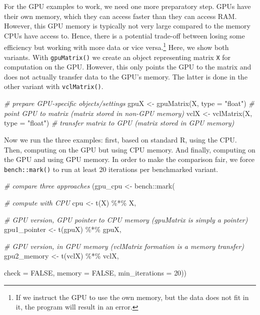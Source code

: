 \documentclass[
  12pt,
]{style/krantz}
\newenvironment{Shaded}{\begin{snugshade}}{\end{snugshade}}
\newcommand{\AttributeTok}[1]{\textcolor[rgb]{0.77,0.63,0.00}{#1}}
\newcommand{\CommentTok}[1]{\textcolor[rgb]{0.56,0.35,0.01}{\textit{#1}}}
\newcommand{\ConstantTok}[1]{\textcolor[rgb]{0.00,0.00,0.00}{#1}}
\newcommand{\DecValTok}[1]{\textcolor[rgb]{0.00,0.00,0.81}{#1}}
\newcommand{\FunctionTok}[1]{\textcolor[rgb]{0.00,0.00,0.00}{#1}}
\newcommand{\NormalTok}[1]{#1}
\newcommand{\OtherTok}[1]{\textcolor[rgb]{0.56,0.35,0.01}{#1}}
\newcommand{\SpecialCharTok}[1]{\textcolor[rgb]{0.00,0.00,0.00}{#1}}
\newcommand{\StringTok}[1]{\textcolor[rgb]{0.31,0.60,0.02}{#1}}
\begin{document}
For the GPU examples to work, we need one more preparatory step. GPUs have their own memory, which they can access faster than they can access RAM. However, this GPU memory is typically not very large compared to the memory CPUs have access to. Hence, there is a potential trade-off between losing some efficiency but working with more data or vice versa.\footnote{If we instruct the GPU to use the own memory, but the data does not fit in it, the program will result in an error.} Here, we show both variants. With \texttt{gpuMatrix()} we create an object representing matrix \texttt{X} for computation on the GPU. However, this only points the GPU to the matrix and does not actually transfer data to the GPU's memory. The latter is done in the other variant with \texttt{vclMatrix()}.

\begin{Shaded}
\begin{Highlighting}[]
\CommentTok{\# prepare GPU{-}specific objects/settings}
\NormalTok{gpuX }\OtherTok{\textless{}{-}} \FunctionTok{gpuMatrix}\NormalTok{(X, }\AttributeTok{type =} \StringTok{"float"}\NormalTok{)  }\CommentTok{\# point GPU to matrix (matrix stored in non{-}GPU memory)}
\NormalTok{vclX }\OtherTok{\textless{}{-}} \FunctionTok{vclMatrix}\NormalTok{(X, }\AttributeTok{type =} \StringTok{"float"}\NormalTok{)  }\CommentTok{\# transfer matrix to GPU (matrix stored in GPU memory)}
\end{Highlighting}
\end{Shaded}

Now we run the three examples: first, based on standard R, using the CPU. Then, computing on the GPU but using CPU memory. And finally, computing on the GPU and using GPU memory. In order to make the comparison fair, we force \texttt{bench::mark()} to run at least 20 iterations per benchmarked variant.

\begin{Shaded}
\begin{Highlighting}[]
\CommentTok{\# compare three approaches}
\NormalTok{(gpu\_cpu }\OtherTok{\textless{}{-}}\NormalTok{ bench}\SpecialCharTok{::}\FunctionTok{mark}\NormalTok{(}
  
  \CommentTok{\# compute with CPU }
\NormalTok{  cpu }\OtherTok{\textless{}{-}} \FunctionTok{t}\NormalTok{(X) }\SpecialCharTok{\%*\%}\NormalTok{ X,}
  
  \CommentTok{\# GPU version, GPU pointer to CPU memory (gpuMatrix is simply a pointer)}
\NormalTok{  gpu1\_pointer }\OtherTok{\textless{}{-}} \FunctionTok{t}\NormalTok{(gpuX) }\SpecialCharTok{\%*\%}\NormalTok{ gpuX,}
  
  \CommentTok{\# GPU version, in GPU memory (vclMatrix formation is a memory transfer)}
\NormalTok{  gpu2\_memory }\OtherTok{\textless{}{-}} \FunctionTok{t}\NormalTok{(vclX) }\SpecialCharTok{\%*\%}\NormalTok{ vclX,}
 
\AttributeTok{check =} \ConstantTok{FALSE}\NormalTok{, }\AttributeTok{memory =} \ConstantTok{FALSE}\NormalTok{, }\AttributeTok{min\_iterations =} \DecValTok{20}\NormalTok{))}
\end{Highlighting}
\end{Shaded}
\end{document}
